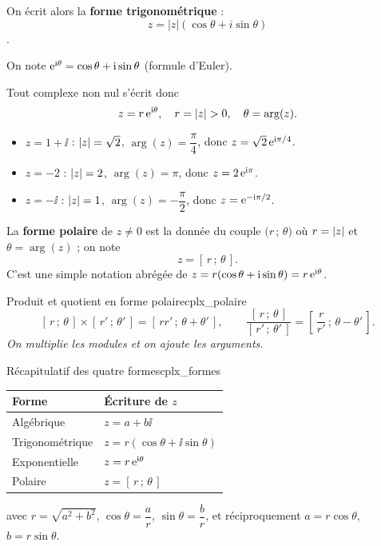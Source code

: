 	On écrit alors la \textbf{forme trigonométrique} :
	$$z = |z|\!\left(\cos\theta + i\sin\theta\right)$$.


\begin{definition}
	On note $\mathrm{e}^{\mathrm{i}\theta} = \cos\theta + \mathrm{i}\sin\theta$ (formule d'Euler).

	Tout complexe non nul s'écrit donc
	$$
	z = r\,\mathrm{e}^{\mathrm{i}\theta}, \quad r = \left|z\right| > 0,\quad \theta = \arg(z).
	$$
\end{definition}

\begin{exemple}
	\begin{itemize}[label=\textbullet]
		\item $z = 1 + \ii$ : $\left|z\right| = \sqrt{2}$, $\arg(z) = \dfrac{\pi}{4}$,
		donc $z = \sqrt{2}\,\mathrm{e}^{\mathrm{i}\pi/4}$.
		\item $z = -2$ : $\left|z\right| = 2$, $\arg(z) = \pi$,
		donc $z = 2\,\mathrm{e}^{\mathrm{i}\pi}$.
		\item $z = -\ii$ : $\left|z\right| = 1$, $\arg(z) = -\dfrac{\pi}{2}$,
		donc $z = \mathrm{e}^{-\mathrm{i}\pi/2}$.
	\end{itemize}
\end{exemple}

\begin{definition}
	La \textbf{forme polaire} de $z \neq 0$ est la donnée du couple
	$\bigl(r\,;\,\theta\bigr)$ où $r = \left|z\right|$ et $\theta = \arg(z)$ ; on note
	$$
	z = [\,r\,;\,\theta\,].
	$$
	C'est une simple notation abrégée de $z = r(\cos\theta + \mathrm{i}\sin\theta) = r\,\mathrm{e}^{\mathrm{i}\theta}$.
\end{definition}

\begin{propriete}{Produit et quotient en forme polaire}{cplx_polaire}
	$$
	[\,r\,;\,\theta\,]\times[\,r'\,;\,\theta'\,] = [\,rr'\,;\,\theta+\theta'\,],
	\qquad
	\frac{[\,r\,;\,\theta\,]}{[\,r'\,;\,\theta'\,]} = \left[\,\frac{r}{r'}\,;\,\theta-\theta'\,\right].
	$$
	\emph{On multiplie les modules et on ajoute les arguments.}
\end{propriete}

\begin{propriete}{Récapitulatif des quatre formes}{cplx_formes}
	\begin{center}
	\renewcommand{\arraystretch}{1.4}
	\begin{tabular}{>{\raggedright\arraybackslash}p{2.6cm}
	                >{\raggedright\arraybackslash}p{5.2cm}}
	\hline
	\textbf{Forme} & \textbf{Écriture de $z$} \\
	\hline
	Algébrique & $z = a + b\ii$ \\
	Trigonométrique & $z = r(\cos\theta + \ii\sin\theta)$ \\
	Exponentielle & $z = r\,\mathrm{e}^{\mathrm{i}\theta}$ \\
	Polaire & $z = [\,r\,;\,\theta\,]$ \\
	\hline
	\end{tabular}
	\end{center}
	avec $r = \sqrt{a^2+b^2}$, $\cos\theta = \dfrac{a}{r}$, $\sin\theta = \dfrac{b}{r}$,
	et réciproquement $a = r\cos\theta$, $b = r\sin\theta$.
\end{propriete}

